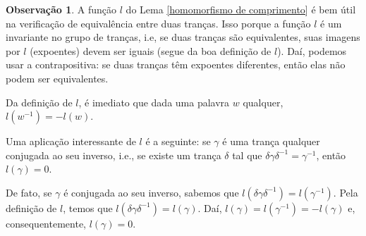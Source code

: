 \documentclass[a4paper,portuguese,11pt,twoside, leqno]{book}
\theoremstyle{definition}
\newtheorem{remark}{Observação}[section]
\newtheorem{exercise}{Exercício}[section]
\begin{document}
	\begin{remark}
		A função $l$ do Lema \eqref{homomorfismo de comprimento} é bem útil na verificação de equivalência entre duas tranças. Isso porque a função $l$ é um invariante no grupo de tranças, i.e, se duas tranças são equivalentes, suas imagens por $l$ (expoentes) devem ser iguais (segue da boa definição de $l$). Daí, podemos usar a contrapositiva: se duas tranças têm expoentes diferentes, então elas não podem ser equivalentes.
	\end{remark}
	
	\par\vspace{0.3cm} Da definição de $l$, é imediato que dada uma palavra $w$ qualquer, $l(w^{-1}) = -l(w)$.
	
	\par\vspace{0.3cm} Uma aplicação interessante de $l$ é a seguinte: se $\gamma$ é uma trança qualquer conjugada ao seu inverso, i.e., se existe um trança $\delta$ tal que $\delta\gamma\delta^{-1} = \gamma^{-1}$, então $l(\gamma) = 0$.
	
	\par\vspace{0.3cm} De fato, se $\gamma$ é conjugada ao seu inverso, sabemos que $l(\delta\gamma\delta^{-1}) = l(\gamma^{-1})$. Pela definição de $l$, temos que $l(\delta\gamma\delta^{-1}) = l(\gamma)$. Daí, $l(\gamma) = l(\gamma^{-1}) = -l(\gamma)$ e, consequentemente, $l(\gamma) = 0$.
	
	
	
	
	
\end{document}
